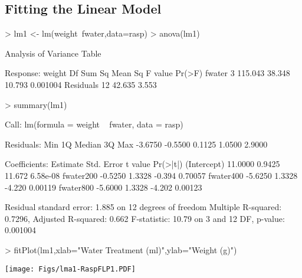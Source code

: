 \documentclass[a4paper]{article}
\begin{document}
\subsection{Fitting the Linear Model}
\vspace{-12pt}
\begin{Schunk}
\begin{Sinput}
> lm1 <- lm(weight~fwater,data=rasp)
> anova(lm1)
\end{Sinput}
\begin{Soutput}
Analysis of Variance Table

Response: weight
          Df  Sum Sq Mean Sq F value   Pr(>F)
fwater     3 115.043  38.348  10.793 0.001004
Residuals 12  42.635   3.553                 
\end{Soutput}
\begin{Sinput}
> summary(lm1)
\end{Sinput}
\begin{Soutput}
Call:
lm(formula = weight ~ fwater, data = rasp)

Residuals:
    Min      1Q  Median      3Q     Max 
-3.6750 -0.5500  0.1125  1.0500  2.9000 

Coefficients:
            Estimate Std. Error t value Pr(>|t|)
(Intercept)  11.0000     0.9425  11.672 6.58e-08
fwater200    -0.5250     1.3328  -0.394  0.70057
fwater400    -5.6250     1.3328  -4.220  0.00119
fwater800    -5.6000     1.3328  -4.202  0.00123

Residual standard error: 1.885 on 12 degrees of freedom
Multiple R-squared: 0.7296,	Adjusted R-squared: 0.662 
F-statistic: 10.79 on 3 and 12 DF,  p-value: 0.001004 
\end{Soutput}
\begin{Sinput}
> fitPlot(lm1,xlab="Water Treatment (ml)",ylab="Weight (g)")
\end{Sinput}
\end{Schunk}

\texttt{[image: Figs/lma1-RaspFLP1.PDF]}
\end{document}
